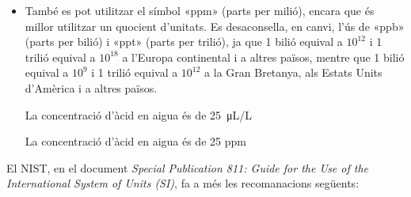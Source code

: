 \begin{itemize}
\textcolor{Blue}\faExclamationTriangle{} 15\%

\textcolor{Blue}\faExclamationTriangle{} 15 per cent


\item També es pot utilitzar el símbol «ppm» (parts per milió), encara que és millor utilitzar un quocient d'unitats. Es desaconsella, en canvi, l'ús de «ppb» (parts per bilió) i «ppt» (parts per trilió), ja que 1 bilió equival a $10^{12}$ i 1 trilió equival a $10^{18}$ a l'Europa continental i a altres països, mentre que 1 bilió equival a $10^{9}$ i 1 trilió equival a $10^{12}$ a la Gran Bretanya, als Estats Units d'Amèrica i a altres països.

\textcolor{Green}\faCheckSquare{} La concentració d'àcid en aigua és de \qty{25}{\micro L/L}

\textcolor{Blue}\faExclamationTriangle{} La concentració d'àcid en aigua és de 25 ppm

\end{itemize}


El NIST, en el document \textit{Special Publication 811:
Guide for the Use of the International System of Units (SI)},  fa a més les recomanacions següents:

